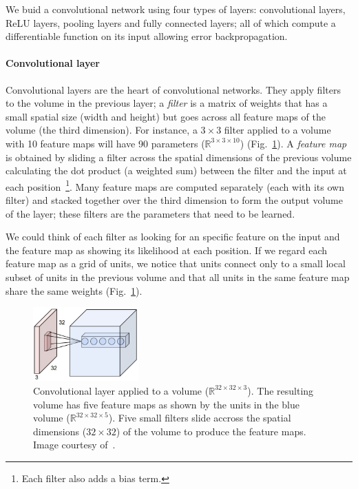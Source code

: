 We buid a convolutional network using four types of layers: convolutional layers, ReLU layers, pooling layers and fully connected layers; all of which compute a differentiable function on its input allowing error backpropagation.

\paragraph{Convolutional layer} Convolutional layers are the heart of convolutional networks. They apply filters to the volume in the previous layer; a \emph{filter} is a matrix of weights that has a small spatial size (width and height) but goes across all feature maps of the volume (the third dimension). For instance, a $3\times 3$ filter applied to a volume with 10 feature maps will have 90 parameters ($\mathbb{R}^{3\times3\times10}$) (Fig.~\ref{fig:ConvLayer}).
A \emph{feature map} is obtained by sliding a filter across the spatial dimensions of the previous volume calculating the dot product (a weighted sum) between the filter and the input at each position~\footnote{Each filter also adds a bias term.}. Many feature maps are computed separately (each with its own filter) and stacked together over the third dimension to form the output volume of the layer; these filters are the parameters that need to be learned.

We could think of each filter as looking for an specific feature on the input and the feature map as showing its likelihood at each position. If we regard each feature map as a grid of units, we notice that units connect only to a small local subset of units in the previous volume and that all units in the same feature map share the same weights (Fig.~\ref{fig:ConvLayer}).
\begin{figure}[h]
	\centering
	\includegraphics[width = 0.36\textwidth]{plots/convLayer.jpeg}
	\caption[Convolutional layer applied to a volume]{Convolutional layer applied to a volume ($\mathbb{R}^{32\times 32\times 3}$). The resulting volume has five feature maps as shown by the units in the blue volume ($\mathbb{R}^{32\times 32\times 5}$). Five small filters slide accross the spatial dimensions ($32\times 32$) of the volume to produce the feature maps. Image courtesy of~\cite{Karpathy2016}.}
	\label{fig:ConvLayer}
\end{figure}

